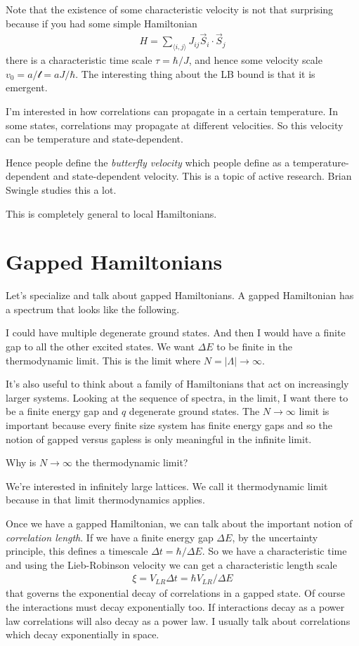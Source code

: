Note that the existence of some characteristic velocity is not that surprising
because if you had some simple Hamiltonian
\begin{align}
    H = \sum_{\langle i, j \rangle}
    J_{ij} \vec{S}_i\cdot \vec{S}_j
\end{align}
there is a characteristic time scale $\tau = \hbar/J$,
and hence some velocity scale $v_0 = a/\mathcal{t} = aJ/\hbar$.
The interesting thing about the LB bound is that it is emergent.

I'm interested in how correlations can propagate in a certain temperature.
In some states, correlations may propagate at different velocities.
So this velocity can be temperature and state-dependent.

Hence people define the \emph{butterfly velocity}
which people define as a temperature-dependent and state-dependent velocity.
This is a topic of active research.
Brian Swingle studies this a lot.

This is completely general to local Hamiltonians.

\section{Gapped Hamiltonians}
Let's specialize and talk about gapped Hamiltonians.
A gapped Hamiltonian has a spectrum that looks like the following.

I could have multiple degenerate ground states.
And then I would have a finite gap to all the other excited states.
We want $\Delta E$ to be finite in the thermodynamic limit.
This is the limit where $N=|\Lambda|\to\infty$.

It's also useful to think about a family of Hamiltonians that act on
increasingly larger systems.
Looking at the sequence of spectra, in the limit, I want there to be a finite
energy gap and $q$ degenerate ground states.
The $N\to\infty$ limit is important because every finite size system has finite
energy gaps and so the notion of gapped versus gapless is only meaningful in the
infinite limit.

\begin{question}
    Why is $N\to\infty$ the thermodynamic limit?
\end{question}
We're interested in infinitely large lattices.
We call it thermodynamic limit because in that limit thermodynamics applies.

Once we have a gapped Hamiltonian, we can talk about the important notion of
\emph{correlation length}.
If we have a finite energy gap $\Delta E$, by the uncertainty principle,
this defines a timescale $\Delta t=\hbar/\Delta E$.
So we have a characteristic time and using the Lieb-Robinson velocity we can
get a characteristic length scale
\begin{align}
    \xi = V_{LR}\Delta t = \hbar V_{LR}/\Delta E
\end{align}
that governs the exponential decay of correlations in a gapped state.
Of course the interactions must decay exponentially too.
If interactions decay as a power law correlations will also decay as a power
law.
I usually talk about correlations which decay exponentially in space.

